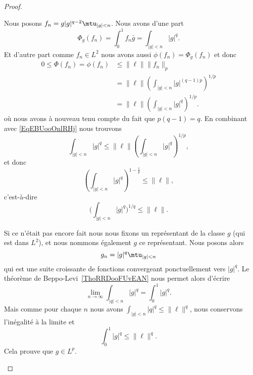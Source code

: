 \begin{proof}
\begin{subproof}
\begin{subproof}
			Nous posons \( f_n=g| g |^{q-2}\mtu_{| g |<n}\). Nous avons d'une part
			\begin{equation}    \label{EqEBUooOnlRHj}
				\Phi_g(f_n)=\int_0^1f_n\bar g=\int_{| g |<n}| g |^q.
			\end{equation}
			Et d'autre part comme \( f_n\in L^2\) nous avons aussi \( \phi(f_n)=\Phi_g(f_n)\) et donc
			\begin{subequations}
				\begin{align}
					0\leq \Phi(f_n)= \phi(f_n) & \leq \| \ell \|\| f_n \|_p                                   \\
					                           & =\| \ell \|\left( \int_{| g |<n}| g |^{(q-1)p} \right)^{1/p} \\
					                           & =\| \ell \|\left( \int_{| g |<n}| g |^q \right)^{1/p}.
				\end{align}
			\end{subequations}
			où nous avons à nouveau tenu compte du fait que \( p(q-1)=q\). En combinant avec \eqref{EqEBUooOnlRHj} nous trouvons
			\begin{equation}
				\int_{| g |<n}| g |^q\leq \| \ell \|\left( \int_{| g |<n}| g |^q \right)^{1/p},
			\end{equation}
			et donc
			\begin{equation}
				\left( \int_{| g |<n}| g |^{q} \right)^{1-\frac{1}{ p }}\leq \| \ell \|,
			\end{equation}
			c'est-à-dire
			\begin{equation}
				\Big( \int_{| g |<n}| g |^q \Big)^{1/q}\leq \| \ell \|.
			\end{equation}

			Si ce n'était pas encore fait nous nous fixons un représentant de la classe \( g\) (qui est dans \( L^2\)), et nous nommons également \( g\) ce représentant. Nous posons alors
			\begin{equation}
				g_n=| g |^q\mtu_{| g |<n}
			\end{equation}
			qui est une suite croissante de fonctions convergeant ponctuellement vers \( | g |^q\). Le théorème de Beppo-Levi~\ref{ThoRRDooFUvEAN} nous permet alors d'écrire
			\begin{equation}
				\lim_{n\to \infty} \int_{| q |<n}| g |^q=\int_{0}^1| g |^q.
			\end{equation}
			Mais comme pour chaque \( n\) nous avons \( \int_{| g |<n}| q |^q\leq \| \ell \|^q\), nous conservons l'inégalité à la limite et
			\begin{equation}
				\int_0^1| g |^q\leq \| \ell \|^q.
			\end{equation}
			Cela prouve que \( g\in L^p\).


\end{subproof}
\end{subproof}
\end{proof}
